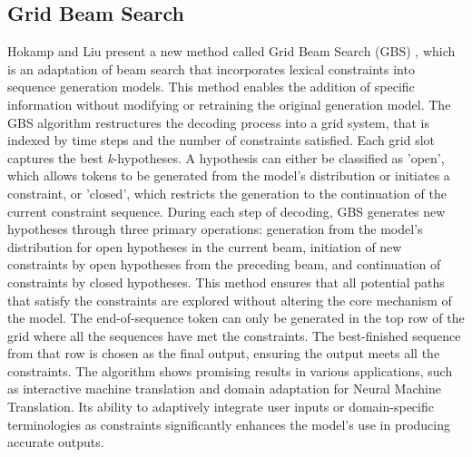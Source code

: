 \subsection{Grid Beam Search}
Hokamp and Liu present a new method called Grid Beam Search (GBS) \cite{hokamp_lexically_2017}, which is an adaptation of beam search that incorporates lexical constraints into sequence generation models. This method enables the addition of specific information without modifying or retraining the original generation model. The GBS algorithm restructures the decoding process into a grid system, that is indexed by time steps and the number of constraints satisfied. Each grid slot captures the best \textit{k}-hypotheses. A hypothesis can either be classified as 'open', which allows tokens to be generated from the model's distribution or initiates a constraint, or 'closed', which restricts the generation to the continuation of the current constraint sequence. During each step of decoding, GBS generates new hypotheses through three primary operations: generation from the model's distribution for open hypotheses in the current beam, initiation of new constraints by open hypotheses from the preceding beam, and continuation of constraints by closed hypotheses. This method ensures that all potential paths that satisfy the constraints are explored without altering the core mechanism of the model. The end-of-sequence token can only be generated in the top row of the grid where all the sequences have met the constraints. The best-finished sequence from that row is chosen as the final output, ensuring the output meets all the constraints. The algorithm shows promising results in various applications, such as interactive machine translation and domain adaptation for Neural Machine Translation. Its ability to adaptively integrate user inputs or domain-specific terminologies as constraints significantly enhances the model's use in producing accurate outputs. 



